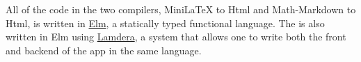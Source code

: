 
\medskip


\medskip



\begin{defitem}
All of the code in the two compilers, MiniLaTeX to Html and Math-Markdown to Html, is written in \href{https://elm-lang.org}{Elm}, a statically typed functional language.  The  is also written in Elm using \href{https://dashboard.lamdera.app/}{Lamdera}, a system that allows one to write both the front and backend of the app in the same language.
\end{defitem}